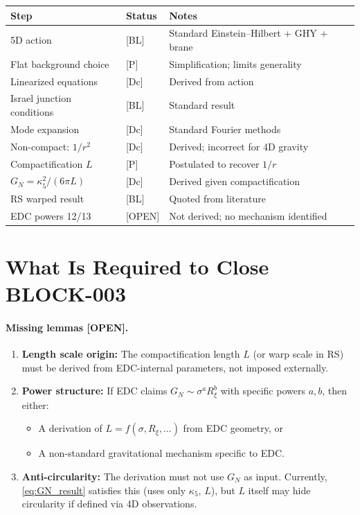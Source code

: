 \documentclass[11pt,a4paper]{article}
\newcommand{\tagBL}{\textcolor{blue!70!black}{[BL]}}
\newcommand{\tagP}{\textcolor{orange!80!black}{[P]}}
\newcommand{\tagOPEN}{\textcolor{red!70!black}{[OPEN]}}
\newcommand{\tagDc}{\textcolor{purple!70!black}{[Dc]}}
\begin{document}
\begin{center}
\renewcommand{\arraystretch}{1.3}
\begin{tabular}{p{4cm}p{1.5cm}p{7cm}}
\toprule
\textbf{Step} & \textbf{Status} & \textbf{Notes} \\
\midrule
5D action & \tagBL{} & Standard Einstein--Hilbert + GHY + brane \\
Flat background choice & \tagP{} & Simplification; limits generality \\
Linearized equations & \tagDc{} & Derived from action \\
Israel junction conditions & \tagBL{} & Standard result \cite{Israel1966} \\
Mode expansion & \tagDc{} & Standard Fourier methods \\
Non-compact: $1/r^2$ & \tagDc{} & Derived; incorrect for 4D gravity \\
Compactification $L$ & \tagP{} & Postulated to recover $1/r$ \\
$G_N = \kappa_5^2/(6\pi L)$ & \tagDc{} & Derived given compactification \\
RS warped result & \tagBL{} & Quoted from literature \\
EDC powers 12/13 & \tagOPEN{} & Not derived; no mechanism identified \\
\bottomrule
\end{tabular}
\end{center}

\section{What Is Required to Close BLOCK-003}
\label{sec:required}

\paragraph{Missing lemmas \tagOPEN{}.}
\begin{enumerate}
    \item \textbf{Length scale origin:} The compactification length $L$ (or warp scale in RS) must be derived from EDC-internal parameters, not imposed externally.

    \item \textbf{Power structure:} If EDC claims $G_N \sim \sigma^a R_\xi^b$ with specific powers $a, b$, then either:
    \begin{itemize}[nosep]
        \item A derivation of $L = f(\sigma, R_\xi, \ldots)$ from EDC geometry, or
        \item A non-standard gravitational mechanism specific to EDC.
    \end{itemize}

    \item \textbf{Anti-circularity:} The derivation must not use $G_N$ as input.
    Currently, \eqref{eq:GN_result} satisfies this (uses only $\kappa_5$, $L$), but $L$ itself may hide circularity if defined via 4D observations.
\end{enumerate}
\end{document}
